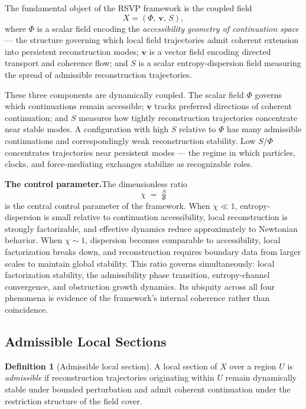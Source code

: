 \documentclass[11pt, a4paper]{article}
\theoremstyle{plain}
\theoremstyle{definition}
\newtheorem{definition}[theorem]{Definition}
\theoremstyle{remark}
\newcommand{\Xfield}{X = (\Phi,\,\mathbf{v},\,S)}
\newcommand{\ctrl}{\tfrac{S}{\Phi}}
\begin{document}
The fundamental object of the RSVP framework is the coupled field
\begin{equation}
  \Xfield,
\end{equation}
where $\Phi$ is a scalar field encoding the \emph{accessibility geometry of
continuation space} --- the structure governing which local field trajectories admit
coherent extension into persistent reconstruction modes; $\mathbf{v}$ is a vector
field encoding directed transport and coherence flow; and $S$ is a scalar
entropy-dispersion field measuring the spread of admissible reconstruction
trajectories.

These three components are dynamically coupled. The scalar field $\Phi$ governs
which continuations remain accessible; $\mathbf{v}$ tracks preferred directions of
coherent continuation; and $S$ measures how tightly reconstruction trajectories
concentrate near stable modes. A configuration with high $S$ relative to $\Phi$ has
many admissible continuations and correspondingly weak reconstruction stability. Low
$S/\Phi$ concentrates trajectories near persistent modes --- the regime in which
particles, clocks, and force-mediating exchanges stabilize as recognizable roles.

\medskip
\noindent\textbf{The control parameter.}\quad The dimensionless ratio
\begin{equation}
  \label{eq:control}
  \chi \;=\; \ctrl
\end{equation}
is the central control parameter of the framework. When $\chi \ll 1$,
entropy-dispersion is small relative to continuation accessibility, local
reconstruction is strongly factorizable, and effective dynamics reduce approximately
to Newtonian behavior. When $\chi \sim 1$, dispersion becomes comparable to
accessibility, local factorization breaks down, and reconstruction requires boundary
data from larger scales to maintain global stability. This ratio governs
simultaneously: local factorization stability, the admissibility phase transition,
entropy-channel convergence, and obstruction growth dynamics. Its ubiquity across all
four phenomena is evidence of the framework's internal coherence rather than
coincidence.

\subsection{Admissible Local Sections}

\begin{definition}[Admissible local section]
\label{def:admissible}
A local section of $X$ over a region $U$ is \emph{admissible} if reconstruction
trajectories originating within $U$ remain dynamically stable under bounded
perturbation and admit coherent continuation under the restriction structure of the
field cover.
\end{definition}
\end{document}
